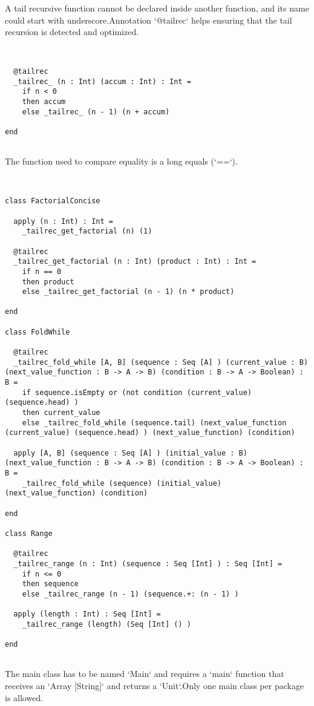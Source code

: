 \documentclass[12pt,a4paper]{article}
\begin{document}
A tail recursive function cannot be declared inside another function, and its name could start with underscore.Annotation `@tailrec` helps ensuring that the tail recursion is detected and optimized. 


\begin{lstlisting}


  @tailrec
  _tailrec_ (n : Int) (accum : Int) : Int =
    if n < 0
    then accum
    else _tailrec_ (n - 1) (n + accum)

end


\end{lstlisting}

The function used to compare equality is a long equals (`==`). 


\begin{lstlisting}


class FactorialConcise

  apply (n : Int) : Int =
    _tailrec_get_factorial (n) (1)

  @tailrec
  _tailrec_get_factorial (n : Int) (product : Int) : Int =
    if n == 0
    then product
    else _tailrec_get_factorial (n - 1) (n * product)

end

class FoldWhile

  @tailrec
  _tailrec_fold_while [A, B] (sequence : Seq [A] ) (current_value : B) (next_value_function : B -> A -> B) (condition : B -> A -> Boolean) : B =
    if sequence.isEmpty or (not condition (current_value) (sequence.head) )
    then current_value
    else _tailrec_fold_while (sequence.tail) (next_value_function (current_value) (sequence.head) ) (next_value_function) (condition)

  apply [A, B] (sequence : Seq [A] ) (initial_value : B) (next_value_function : B -> A -> B) (condition : B -> A -> Boolean) : B =
    _tailrec_fold_while (sequence) (initial_value) (next_value_function) (condition)

end

class Range

  @tailrec
  _tailrec_range (n : Int) (sequence : Seq [Int] ) : Seq [Int] =
    if n <= 0
    then sequence
    else _tailrec_range (n - 1) (sequence.+: (n - 1) )

  apply (length : Int) : Seq [Int] =
    _tailrec_range (length) (Seq [Int] () )

end


\end{lstlisting}

The main class has to be named `Main` and requires a `main` function that receives an `Array [String]` and returns a `Unit`.Only one main class per package is allowed. 
\end{document}
